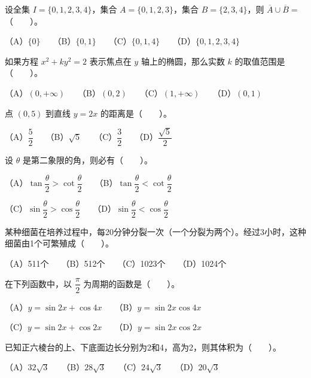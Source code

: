 \begin{question}
设全集 $I=\{0,1,2,3,4\}$，集合 $A=\{0,1,2,3\}$，集合 $B=\{2,3,4\}$，则 $\overline{A}\cup\overline{B}=$\mbox{（　　）}。

（A）$\{0\}$　　（B）$\{0,1\}$　　（C）$\{0,1,4\}$　　（D）$\{0,1,2,3,4\}$

\end{question}
\begin{question}
如果方程 $x^2+ky^2=2$ 表示焦点在 $y$ 轴上的椭圆，那么实数 $k$ 的取值范围是\mbox{（　　）}。

（A）$(0,+\infty)$　　（B）$(0,2)$　　（C）$(1,+\infty)$　　（D）$(0,1)$

\end{question}
\begin{question}
点 $(0,5)$ 到直线 $y=2x$ 的距离是\mbox{（　　）}。

（A）$\dfrac52$　　（B）$\sqrt5$　　（C）$\dfrac32$　　（D）$\dfrac{\sqrt5}{2}$

\end{question}
\begin{question}
设 $\theta$ 是第二象限的角，则必有\mbox{（　　）}。

（A）$\tan\dfrac\theta2>\cot\dfrac\theta2$　　（B）$\tan\dfrac\theta2<\cot\dfrac\theta2$

（C）$\sin\dfrac\theta2>\cos\dfrac\theta2$　　（D）$\sin\dfrac\theta2<\cos\dfrac\theta2$

\end{question}
\begin{question}
某种细菌在培养过程中，每20分钟分裂一次（一个分裂为两个）。经过3小时，这种细菌由1个可繁殖成\mbox{（　　）}。

（A）511个　　（B）512个　　（C）1023个　　（D）1024个

\end{question}
\begin{question}
在下列函数中，以 $\dfrac\pi2$ 为周期的函数是\mbox{（　　）}。

（A）$y=\sin2x+\cos4x$　　（B）$y=\sin2x\cos4x$

（C）$y=\sin2x+\cos2x$　　（D）$y=\sin2x\cos2x$

\end{question}
\begin{question}
已知正六棱台的上、下底面边长分别为2和4，高为2，则其体积为\mbox{（　　）}。

（A）$32\sqrt3$　　（B）$28\sqrt3$　　（C）$24\sqrt3$　　（D）$20\sqrt3$

\end{question}
